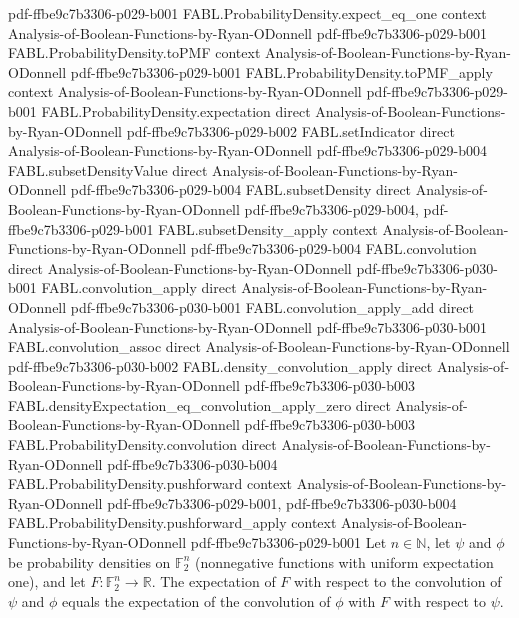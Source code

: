 \begin{theorem}
  {pdf-ffbe9c7b3306-p029-b001}
\proofstep
  {FABL.ProbabilityDensity.expect_eq_one}
  {context}
  {Analysis-of-Boolean-Functions-by-Ryan-ODonnell}
  {pdf-ffbe9c7b3306-p029-b001}
\proofstep
  {FABL.ProbabilityDensity.toPMF}
  {context}
  {Analysis-of-Boolean-Functions-by-Ryan-ODonnell}
  {pdf-ffbe9c7b3306-p029-b001}
\proofstep
  {FABL.ProbabilityDensity.toPMF_apply}
  {context}
  {Analysis-of-Boolean-Functions-by-Ryan-ODonnell}
  {pdf-ffbe9c7b3306-p029-b001}
\proofstep
  {FABL.ProbabilityDensity.expectation}
  {direct}
  {Analysis-of-Boolean-Functions-by-Ryan-ODonnell}
  {pdf-ffbe9c7b3306-p029-b002}
\proofstep
  {FABL.setIndicator}
  {direct}
  {Analysis-of-Boolean-Functions-by-Ryan-ODonnell}
  {pdf-ffbe9c7b3306-p029-b004}
\proofstep
  {FABL.subsetDensityValue}
  {direct}
  {Analysis-of-Boolean-Functions-by-Ryan-ODonnell}
  {pdf-ffbe9c7b3306-p029-b004}
\proofstep
  {FABL.subsetDensity}
  {direct}
  {Analysis-of-Boolean-Functions-by-Ryan-ODonnell}
  {pdf-ffbe9c7b3306-p029-b004,
    pdf-ffbe9c7b3306-p029-b001}
\proofstep
  {FABL.subsetDensity_apply}
  {context}
  {Analysis-of-Boolean-Functions-by-Ryan-ODonnell}
  {pdf-ffbe9c7b3306-p029-b004}
\proofstep
  {FABL.convolution}
  {direct}
  {Analysis-of-Boolean-Functions-by-Ryan-ODonnell}
  {pdf-ffbe9c7b3306-p030-b001}
\proofstep
  {FABL.convolution_apply}
  {direct}
  {Analysis-of-Boolean-Functions-by-Ryan-ODonnell}
  {pdf-ffbe9c7b3306-p030-b001}
\proofstep
  {FABL.convolution_apply_add}
  {direct}
  {Analysis-of-Boolean-Functions-by-Ryan-ODonnell}
  {pdf-ffbe9c7b3306-p030-b001}
\proofstep
  {FABL.convolution_assoc}
  {direct}
  {Analysis-of-Boolean-Functions-by-Ryan-ODonnell}
  {pdf-ffbe9c7b3306-p030-b002}
\proofstep
  {FABL.density_convolution_apply}
  {direct}
  {Analysis-of-Boolean-Functions-by-Ryan-ODonnell}
  {pdf-ffbe9c7b3306-p030-b003}
\proofstep
  {FABL.densityExpectation_eq_convolution_apply_zero}
  {direct}
  {Analysis-of-Boolean-Functions-by-Ryan-ODonnell}
  {pdf-ffbe9c7b3306-p030-b003}
\proofstep
  {FABL.ProbabilityDensity.convolution}
  {direct}
  {Analysis-of-Boolean-Functions-by-Ryan-ODonnell}
  {pdf-ffbe9c7b3306-p030-b004}
\proofstep
  {FABL.ProbabilityDensity.pushforward}
  {context}
  {Analysis-of-Boolean-Functions-by-Ryan-ODonnell}
  {pdf-ffbe9c7b3306-p029-b001,
    pdf-ffbe9c7b3306-p030-b004}
\proofstep
  {FABL.ProbabilityDensity.pushforward_apply}
  {context}
  {Analysis-of-Boolean-Functions-by-Ryan-ODonnell}
  {pdf-ffbe9c7b3306-p029-b001}
Let $n\in\mathbb{N}$, let $\psi$ and $\phi$ be probability densities on $\mathbb{F}_2^n$
(nonnegative functions with uniform expectation one), and let
$F:\mathbb{F}_2^n\to\mathbb{R}$. The expectation of $F$ with respect to the convolution
of $\psi$ and $\phi$ equals the expectation of the convolution of $\phi$ with $F$ with
respect to $\psi$.
\end{theorem}

